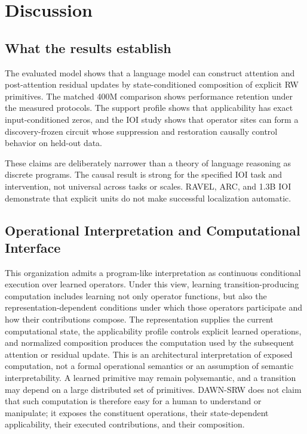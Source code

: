 \documentclass{article}
\newcommand{\DAWN}{DAWN-SRW}
\begin{document}
\balance
\section{Discussion}
\label{sec:discussion}

\subsection{What the results establish}

The evaluated model shows that a language model can construct attention and
post-attention residual updates by state-conditioned composition of explicit
RW primitives. The matched 400M comparison shows performance
retention under the measured protocols. The support profile shows that
applicability has exact input-conditioned zeros, and the IOI study shows that
operator sites can form a discovery-frozen circuit whose suppression and
restoration causally control behavior on held-out data.

These claims are deliberately narrower than a theory of language reasoning as
discrete programs. The causal result is strong for the specified IOI task and
intervention, not universal across tasks or scales. RAVEL, ARC, and 1.3B IOI
demonstrate that explicit units do not make successful localization automatic.

\subsection{Operational Interpretation and Computational Interface}

This organization admits a program-like interpretation as continuous
conditional execution over learned operators. Under this view, learning
transition-producing computation includes learning not only operator functions,
but also the representation-dependent conditions under which those operators
participate and how their contributions compose. The representation supplies
the current computational state,
the applicability profile controls explicit learned operations, and normalized
composition produces the computation used by the subsequent attention or
residual update. This is an architectural interpretation of exposed
computation, not a formal operational semantics or an assumption of semantic
interpretability. A learned primitive may remain polysemantic, and a transition
may depend on a large distributed set of primitives. \DAWN{} does not claim that
such computation is therefore easy for a human to understand or manipulate;
it exposes the constituent operations, their state-dependent applicability,
their executed contributions, and their composition.
\end{document}
